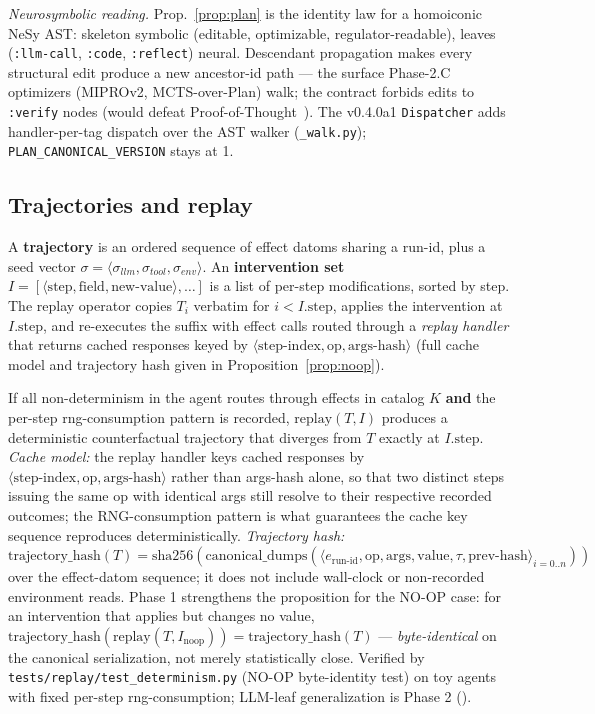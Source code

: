 \documentclass[anon]{nesy2026}   %
\newcommand{\C}[1]{\texttt{#1}}
\begin{document}
\emph{Neurosymbolic reading.} Prop.~\ref{prop:plan} is the identity law for a homoiconic NeSy AST: skeleton symbolic (editable, optimizable, regulator-readable), leaves (\C{:llm-call}, \C{:code}, \C{:reflect}) neural. Descendant propagation makes every structural edit produce a new ancestor-id path --- the surface Phase-2.C optimizers (MIPROv2, MCTS-over-Plan) walk; the contract forbids edits to \C{:verify} nodes (would defeat Proof-of-Thought~\citep{fan2024proofofthought}). The v0.4.0a1 \C{Dispatcher} adds handler-per-tag dispatch over the AST walker (\C{\_walk.py}); \C{PLAN\_CANONICAL\_VERSION} stays at 1.

\subsection{Trajectories and replay}\label{sec:replay}

A \textbf{trajectory} is an ordered sequence of effect datoms sharing a run-id, plus a seed vector $\sigma = \langle \sigma_{llm}, \sigma_{tool}, \sigma_{env} \rangle$. An \textbf{intervention set} $I = [\langle \text{step}, \text{field}, \text{new-value} \rangle, \dots]$ is a list of per-step modifications, sorted by step. The replay operator copies $T_i$ verbatim for $i < I.\text{step}$, applies the intervention at $I.\text{step}$, and re-executes the suffix with effect calls routed through a \emph{replay handler} that returns cached responses keyed by $\langle \text{step-index}, \text{op}, \text{args-hash} \rangle$ (full cache model and trajectory hash given in Proposition~\ref{prop:noop}).

\begin{proposition}\label{prop:noop}
If all non-determinism in the agent routes through effects in catalog $K$ \textbf{and} the per-step rng-consumption pattern is recorded, $\text{replay}(T, I)$ produces a deterministic counterfactual trajectory that diverges from $T$ exactly at $I.\text{step}$. \emph{Cache model:} the replay handler keys cached responses by $\langle \text{step-index}, \text{op}, \text{args-hash} \rangle$ rather than args-hash alone, so that two distinct steps issuing the same op with identical args still resolve to their respective recorded outcomes; the RNG-consumption pattern is what guarantees the cache key sequence reproduces deterministically. \emph{Trajectory hash:} $\text{trajectory\_hash}(T) = \text{sha256}(\text{canonical\_dumps}(\langle e_{\text{run-id}}, \text{op}, \text{args}, \text{value}, \tau, \text{prev-hash} \rangle_{i=0..n}))$ over the effect-datom sequence; it does not include wall-clock or non-recorded environment reads. Phase 1 strengthens the proposition for the NO-OP case: for an intervention that applies but changes no value, $\text{trajectory\_hash}(\text{replay}(T, I_{\text{noop}})) = \text{trajectory\_hash}(T)$ --- \emph{byte-identical} on the canonical serialization, not merely statistically close. Verified by \C{tests/replay/test\_determinism.py} (NO-OP byte-identity test) on toy agents with fixed per-step rng-consumption; LLM-leaf generalization is Phase 2 ().
\end{proposition}
\end{document}
